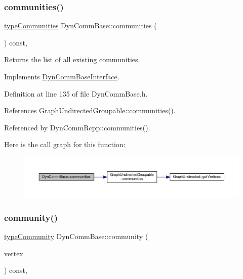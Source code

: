 \subsubsection{\texorpdfstring{communities()}{communities()}}
{\footnotesize\ttfamily \hyperlink{graphUndirectedGroupable_8h_ab79c7252155ca17cb49aa0b1fea30116}{type\+Communities} Dyn\+Comm\+Base\+::communities (\begin{DoxyParamCaption}{ }\end{DoxyParamCaption}) const\hspace{0.3cm}{\ttfamily [inline]}, {\ttfamily [virtual]}}

\begin{DoxyReturn}{Returns}
the list of all existing communities 
\end{DoxyReturn}


Implements \hyperlink{classDynCommBaseInterface_aedba7e43ae301ab910340f1d766d1698}{Dyn\+Comm\+Base\+Interface}.



Definition at line 135 of file Dyn\+Comm\+Base.\+h.



References Graph\+Undirected\+Groupable\+::communities().



Referenced by Dyn\+Comm\+Rcpp\+::communities().

Here is the call graph for this function\+:
\nopagebreak
\begin{figure}[H]
\begin{center}
\leavevmode
\includegraphics[width=350pt]{classDynCommBase_a064d9909a91cfe25acf05e6bd1fc967d_cgraph}
\end{center}
\end{figure}
\mbox{\label{classDynCommBase_a651753518a2de4ea52caea518e74d878}} 
\subsubsection{\texorpdfstring{community()}{community()}}
{\footnotesize\ttfamily \hyperlink{graphUndirectedGroupable_8h_a914da95c9ea7f14f4b7f875c36818556}{type\+Community} Dyn\+Comm\+Base\+::community (\begin{DoxyParamCaption}\item[{\hyperlink{edge_8h_a5fbd20c46956d479cb10afc9855223f6}{type\+Vertex}}]{vertex }\end{DoxyParamCaption}) const\hspace{0.3cm}{\ttfamily [inline]}, {\ttfamily [virtual]}}


